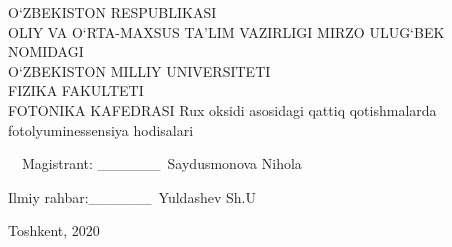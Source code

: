 \documentclass[14pt]{article}
\begin{document}
	\begin{titlepage}
		\begin{center}
			\large
			O`ZBEKISTON RESPUBLIKASI\\ OLIY VA O`RTA-MAXSUS TA'LIM VAZIRLIGI
			MIRZO ULUG`BEK NOMIDAGI\\O`ZBEKISTON MILLIY UNIVERSITETI\\FIZIKA FAKULTETI\\FOTONIKA KAFEDRASI
			\vspace{0.25cm}
			\vfill
			\Large 			
			\Huge		
			{\Huge Rux oksidi asosidagi qattiq qotishmalarda fotolyuminessensiya hodisalari\\
			}
			\bigskip
		\end{center}
		\vfill
		\huge \ \  Magistrant: \_\_\_\_\_\_\ Saydusmonova Nihola
		
		\huge Ilmiy rahbar:\_\_\_\_\_\_\ Yuldashev Sh.U
		\vfill
		\begin{center}
			Toshkent, 2020
		\end{center}
	\end{titlepage}
	\newpage
	\renewcommand{\contentsname}{Mundarija}
	\tableofcontents
	\newpage
\end{document}
